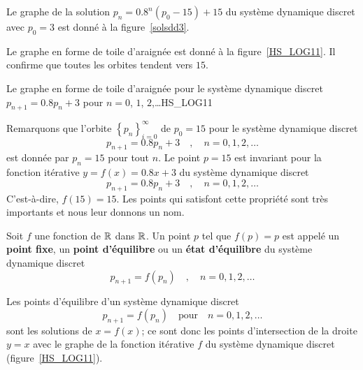 {\begin{egg}
Le graphe de la solution $p_n = 0.8^n (p_0 - 15) + 15$ du système
dynamique discret avec $p_0=3$ est donné à la figure~\ref{solsdd3}.


Le graphe en forme de toile d'araignée est donné à la
figure~\ref{HS_LOG11}.  Il confirme que toutes les orbites tendent
vers $15$.

{Le graphe en forme de toile d'araignée pour le système dynamique
discret $p_{n+1} = 0.8 p_n + 3$ pour $n=0$, $1$, $2$,\ldots}{HS_LOG11}

Remarquons que l'orbite $\displaystyle \left\{ p_n \right\}_{i=0}^\infty$
de $p_0=15$ pour le système dynamique discret
\[
p_{n+1} = 0.8 p_n + 3 \quad , \quad n=0, 1, 2, \ldots
\]
est donnée par $p_n = 15$ pour tout $n$.  Le point $p=15$ est
invariant pour la fonction itérative $y= f(x) = 0.8x + 3$
du système dynamique discret
\[
p_{n+1} = 0.8 p_n + 3 \quad , \quad n=0, 1, 2, \ldots
\]
C'est-à-dire, $f(15) = 15$.  Les points qui satisfont cette propriété
sont très importants et nous leur donnons un nom.
\label{sol_lin_discr}
\end{egg}

\begin{focus}{\dfn}
Soit $f$ une fonction de $\mathbb{R}$ dans $\mathbb{R}$.  Un point $p$ tel que
$f(p) = p$ est appelé un {\bfseries point fixe}, un
{\bfseries point d'équilibre} ou un {\bfseries état d'équilibre} du
système dynamique discret
\[
p_{n+1} = f(p_n) \quad , \quad n=0, 1, 2, \ldots
\]
\end{focus}

Les points d'équilibre d'un système dynamique discret
\[
p_{n+1} = f(p_n) \quad \text{pour} \quad n=0, 1, 2, \ldots
\]
sont les solutions de $x=f(x)$; ce sont donc les points d'intersection
de la droite $y=x$ avec le graphe de la fonction itérative $f$ du
système dynamique discret (figure~\ref{HS_LOG11}).

}
